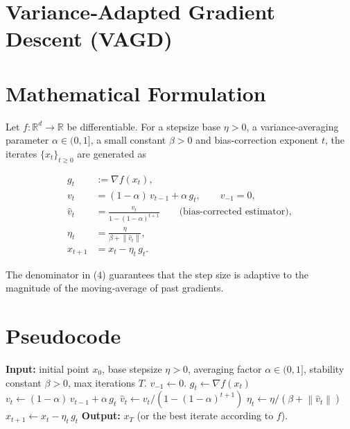 \documentclass{article}
\newcommand{\norm}[1]{\left\|#1\right\|}
\begin{document}
\section*{Variance‑Adapted Gradient Descent (VAGD)}

\section*{Mathematical Formulation}
Let $f:\mathbb{R}^d\rightarrow\mathbb{R}$ be differentiable.  
For a stepsize base $\eta>0$, a variance‑averaging parameter $\alpha\in(0,1]$, a small constant $\beta>0$ and bias‑correction exponent $t$, the iterates $\{x_t\}_{t\ge 0}$ are generated as

\begin{align}
    g_t &:= \nabla f(x_t) ,\tag{1}\\[2mm]
    v_t &= (1-\alpha)\,v_{t-1} + \alpha\, g_t ,\qquad v_{-1}=0, \tag{2}\\[2mm]
    \hat v_t &= \frac{v_t}{1-(1-\alpha)^{t+1}} \qquad\text{(bias‑corrected estimator)} ,\tag{3}\\[2mm]
    \eta_t &= \frac{\eta}{\beta + \norm{\hat v_t}} ,\tag{4}\\[2mm]
    x_{t+1} &= x_t - \eta_t\, g_t .\tag{5}
\end{align}

The denominator in (4) guarantees that the step size is adaptive to the magnitude of the moving‑average of past gradients.

\section*{Pseudocode}
\begin{algorithm}[H]
\caption{Variance‑Adapted Gradient Descent (VAGD)}
\begin{algorithmic}[1]
\STATE \textbf{Input:} initial point $x_0$, base stepsize $\eta>0$, averaging factor $\alpha\in(0,1]$, stability constant $\beta>0$, max iterations $T$.
\STATE $v_{-1}\gets 0$.
    \STATE $g_t \gets \nabla f(x_t)$                                   
    \STATE $v_t \gets (1-\alpha)\,v_{t-1} + \alpha\, g_t$               
    \STATE $\hat v_t \gets v_t/(1-(1-\alpha)^{t+1})$                    
    \STATE $\eta_t \gets \eta/(\beta + \norm{\hat v_t})$                
    \STATE $x_{t+1} \gets x_t - \eta_t\, g_t$                           
\ENDFOR
\STATE \textbf{Output:} $x_T$ (or the best iterate according to $f$).
\end{algorithmic}
\end{algorithm}
\end{document}
